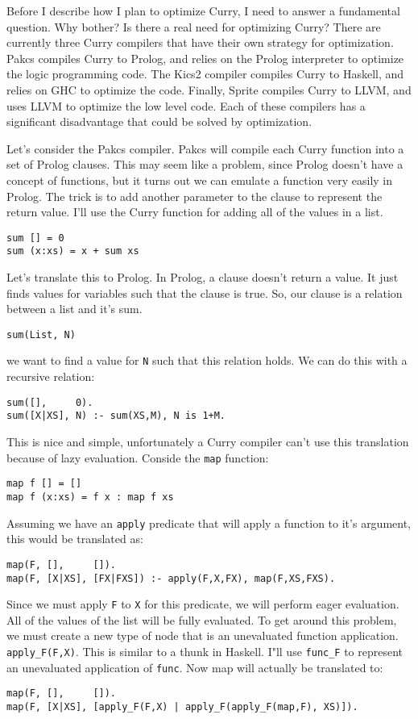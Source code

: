 
Before I describe how I plan to optimize Curry, I need to answer a fundamental question.
Why bother?
Is there a real need for optimizing Curry?
There are currently three Curry compilers that have their own strategy for optimization.
Pakcs compiles Curry to Prolog, and relies on the Prolog interpreter to optimize the logic programming code.
The Kics2 compiler compiles Curry to Haskell, and relies on GHC to optimize the code.
Finally, Sprite compiles Curry to LLVM, and uses LLVM to optimize the low level code.
Each of these compilers has a significant disadvantage that could be solved by optimization.

Let's consider the Pakcs compiler.
Pakcs will compile each Curry function into a set of Prolog clauses.
This may seem like a problem, since Prolog doesn't have a concept of functions,
but it turns out we can emulate a function very easily in Prolog.
The trick is to add another parameter to the clause to represent the return value.
I'll use the Curry function for adding all of the values in a list.

\begin{verbatim}
sum [] = 0
sum (x:xs) = x + sum xs
\end{verbatim}

Let's translate this to Prolog.
In Prolog, a clause doesn't return a value.
It just finds values for variables such that the clause is true.
So, our clause is a relation between a list and it's sum.
\begin{verbatim}
sum(List, N)
\end{verbatim}
we want to find a value for \texttt{N} such that this relation holds.
We can do this with a recursive relation:
\begin{verbatim}
sum([],     0).
sum([X|XS], N) :- sum(XS,M), N is 1+M.
\end{verbatim}

This is nice and simple, unfortunately a Curry compiler can't use this translation
because of lazy evaluation.
Conside the \texttt{map} function:
\begin{verbatim}
map f [] = []
map f (x:xs) = f x : map f xs
\end{verbatim}
Assuming we have an \texttt{apply} predicate that will apply a function to it's argument,
this would be translated as:
\begin{verbatim}
map(F, [],     []).
map(F, [X|XS], [FX|FXS]) :- apply(F,X,FX), map(F,XS,FXS).
\end{verbatim}

Since we must apply \texttt F to \texttt X for this predicate, we will perform eager evaluation.
All of the values of the list will be fully evaluated.
To get around this problem, we must create a new type of node that is an unevaluated function application.
\texttt{apply\_F(F,X)}.
This is similar to a thunk in Haskell.
I"ll use \texttt{func\_F} to represent an unevaluated application of \texttt{func}.
Now map will actually be translated to:
\begin{verbatim}
map(F, [],     []).
map(F, [X|XS], [apply_F(F,X) | apply_F(apply_F(map,F), XS)]).
\end{verbatim}

